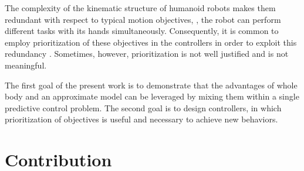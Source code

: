The complexity of the kinematic structure of humanoid robots makes them
redundant with respect to typical motion objectives, \EG, the robot can perform
different tasks with its hands simultaneously. Consequently, it is common to
employ prioritization of these objectives in the controllers in order to
exploit this redundancy \cite{Kanoun2009thesis, Saab2013tro, Sentis2007thesis}.
Sometimes, however, prioritization is not well justified and is not meaningful.


The first goal of the present work is to demonstrate that the advantages of
whole body and an approximate model can be leveraged by mixing them within a
single predictive control problem. The second goal is to design controllers, in
which prioritization of objectives is useful and necessary to achieve new
behaviors.



\section{Contribution}

